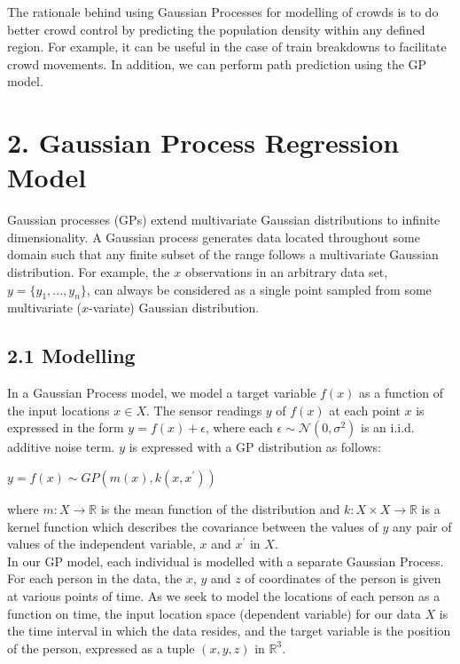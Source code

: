 \documentclass[letterpaper]{article}
\begin{document}
The rationale behind using Gaussian Processes for modelling of crowds is to do better crowd control by predicting the population density within any defined region. For example, it can be useful in the case of train breakdowns to facilitate crowd movements. In addition, we can perform path prediction using the GP model.

\section{2.  Gaussian Process Regression Model}

Gaussian processes (GPs) extend multivariate Gaussian distributions to infinite dimensionality. A Gaussian process generates data located throughout some domain such that any finite subset of the range follows a multivariate Gaussian distribution. For example, the $x$ observations in an arbitrary data set, $y = \{y_1,...,y_n\}$, can always be considered as a single point sampled from some multivariate ($x$-variate) Gaussian distribution. 

\subsection{2.1  Modelling}

In a Gaussian Process model, we model a target variable $f(x)$ as a function of the input locations $x \in X$. The sensor readings $y$ of $f(x)$ at each point $x$ is expressed in the form $y = f(x) + \epsilon$, where each $\epsilon \sim \mathcal{N}(0, \sigma^2)$ is an i.i.d. additive noise term. $y$ is expressed with a GP distribution as follows:

\begin{center}
$y = f(x) \sim GP(m(x), k(x,x^\prime))$
\end{center}

where $m: X \rightarrow \mathbb{R}$ is the mean function of the distribution and $k: X \times X \rightarrow \mathbb{R}$ is a kernel function which describes the covariance between the values of $y$ any pair of values of the independent variable, $x$ and $x^\prime$ in $X$. \\

In our GP model, each individual is modelled with a separate Gaussian Process. For each person in the data, the $x$, $y$ and $z$ of coordinates of the person is given at various points of time. As we seek to model the locations of each person as a function on time, the input location space (dependent variable) for our data $X$ is the time interval in which the data resides, and the target variable is the position of the person, expressed as a tuple $(x,y,z)$ in $\mathbb{R}^3$.
\end{document}
